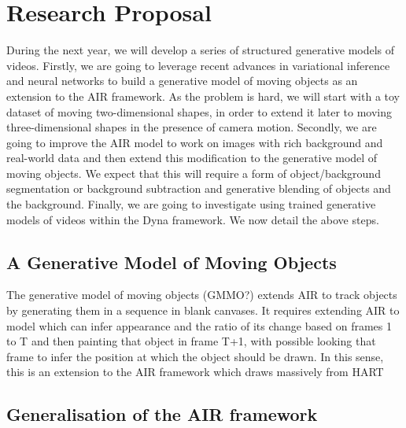 \section{Research Proposal}
\label{sec:proposal}


    During the next year, we will develop a series of structured generative models of videos.
    Firstly, we are going to leverage recent advances in variational inference and neural networks to build a generative model of moving objects as an extension to the AIR framework. 
    As the problem is hard, we will start with a toy dataset of moving two-dimensional shapes, in order to extend it later to moving three-dimensional shapes in the presence of camera motion.
    Secondly, we are going to improve the AIR model to work on images with rich background and real-world data and then extend this modification to the generative model of moving objects. We expect that this will require a form of object/background segmentation or background subtraction and generative blending of objects and the background.
    Finally, we are going to investigate using trained generative models of videos within the Dyna framework.
    We now detail the above steps.
    
    \subsection{A Generative Model of Moving Objects}
        The generative model of moving objects (GMMO?) extends AIR to track objects by generating them in a sequence in blank canvases. It requires extending AIR to model which can infer appearance and the ratio of its change based on frames 1 to T and then painting that object in frame T+1, with possible looking that frame to infer the position at which the object should be drawn. In this sense, this is an extension to the AIR framework which draws massively from HART
        
    \subsection{Generalisation of the AIR framework}
        
